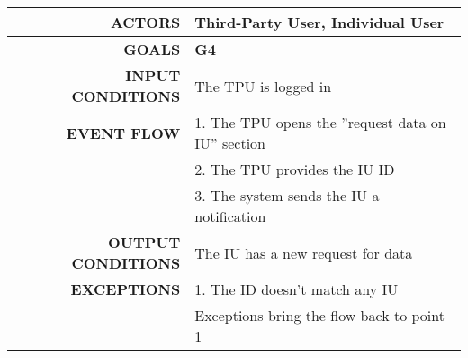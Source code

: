\begin{table}[h!]
\begin{tabular}{|r|p{3in}|}
\hline
\textbf{ACTORS} & Third-Party User, Individual User\\
\hline
\textbf{GOALS} & \textbf{G4}\\
\hline
\textbf{INPUT CONDITIONS} & The TPU is logged in\\
\hline
\textbf{EVENT FLOW} 
&1. The TPU opens the ''request data on IU'' section \\
&2. The TPU provides the IU ID \\
&3. The system sends the IU a notification \\
\hline
\textbf{OUTPUT CONDITIONS} & The IU has a new request for data \\
\hline
\textbf{EXCEPTIONS} 
&1. The ID doesn't match any IU \\
&Exceptions bring the flow back to point 1 \\
\hline
\end{tabular}
\end{table}